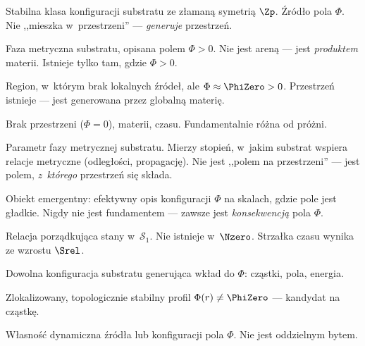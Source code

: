 \begin{remark}\label{rem:interpretacja}
\begin{description}[style=nextline, nosep]
  \item[\textbf{Materia}] Stabilna klasa konfiguracji substratu
    ze z\l{}aman\k{a} symetri\k{a} $\Zp$. \'Zr\'od\l{}o pola $\Phi$.
    Nie ,,mieszka w~przestrzeni'' --- \emph{generuje} przestrze\'n.
  \item[\textbf{Przestrze\'n}] Faza metryczna substratu, opisana
    polem $\Phi > 0$. Nie jest aren\k{a} --- jest \emph{produktem}
    materii. Istnieje tylko tam, gdzie $\Phi > 0$.
  \item[\textbf{Pr\'o\.znia (lokalna)}] Region, w~kt\'orym brak
    lokalnych \'zr\'ode\l{}, ale $\Phi \approx \PhiZero > 0$.
    Przestrze\'n istnieje --- jest generowana przez globaln\k{a}
    materi\k{e}.
  \item[\textbf{Nico\'s\'c ($\Nzero$)}] Brak przestrzeni ($\Phi = 0$),
    materii, czasu. Fundamentalnie r\'o\.zna od pr\'o\.zni.
  \item[\textbf{Pole $\Phi$}] Parametr fazy metrycznej substratu.
    Mierzy stopie\'n, w~jakim substrat wspiera relacje metryczne
    (odleg\l{}o\'sci, propagacj\k{e}). Nie jest ,,polem na
    przestrzeni'' --- jest polem, \emph{z~kt\'orego} przestrze\'n
    si\k{e} sk\l{}ada.
  \item[\textbf{Geometria ($g_{\mu\nu}$)}] Obiekt emergentny:
    efektywny opis konfiguracji $\Phi$ na skalach, gdzie pole
    jest g\l{}adkie. Nigdy nie jest fundamentem --- zawsze jest
    \emph{konsekwencj\k{a}} pola $\Phi$.
  \item[\textbf{Czas}] Relacja porz\k{a}dkuj\k{a}ca stany
    w~$\mathcal{S}_1$. Nie istnieje w~$\Nzero$.
    Strza\l{}ka czasu wynika ze wzrostu $\Srel$.
  \item[\textbf{\'Zr\'od\l{}o}] Dowolna konfiguracja substratu
    generuj\k{a}ca wk\l{}ad do $\Phi$: cz\k{a}stki, pola, energia.
  \item[\textbf{Defekt}] Zlokalizowany, topologicznie stabilny
    profil $\Phi(r) \neq \PhiZero$ --- kandydat na cz\k{a}stk\k{e}.
  \item[\textbf{Energia}] W\l{}asno\'s\'c dynamiczna \'zr\'od\l{}a
    lub konfiguracji pola $\Phi$. Nie jest oddzielnym bytem.
\end{description}
\end{remark}


